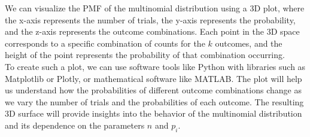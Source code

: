\documentclass[openany]{book}
\begin{document}
\begin{mynote}
We can visualize the PMF of the multinomial distribution using a 3D plot, where the x-axis represents the number of trials, the y-axis represents the probability, and the z-axis represents the outcome combinations. Each point in the 3D space corresponds to a specific combination of counts for the $k$ outcomes, and the height of the point represents the probability of that combination occurring. \\
To create such a plot, we can use software tools like Python with libraries such as Matplotlib or Plotly, or mathematical software like MATLAB. The plot will help us understand how the probabilities of different outcome combinations change as we vary the number of trials and the probabilities of each outcome. The resulting 3D surface will provide insights into the behavior of the multinomial distribution and its dependence on the parameters $n$ and $p_i$.
\end{mynote}
\end{document}

